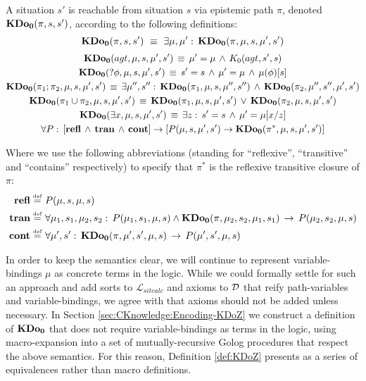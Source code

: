 \begin{defnL}
 A situation $s'$ is reachable
from situation $s$ via epistemic path $\pi$, denoted $\mathbf{KDo_{0}}(\pi,s,s')$,
according to the following definitions:\label{def:KDoZ}\[
\mathbf{KDo_{0}}(\pi,s,s')\,\,\equiv\,\,\exists\mu,\mu':\,\mathbf{KDo_{0}}(\pi,\mu,s,\mu',s')\]
 \begin{gather*}
\mathbf{KDo_{0}}(agt,\mu,s,\mu',s')\,\equiv\,\mu'=\mu\,\wedge\, K_{0}(agt,s',s)\\
\mathbf{KDo_{0}}(?\phi,\mu,s,\mu',s')\,\equiv\, s'=s\,\wedge\,\mu'=\mu\,\wedge\,\mu(\phi)[s]\\
\mathbf{KDo_{0}}(\pi_{1};\pi_{2},\mu,s,\mu',s')\,\equiv\,\exists\mu'',s'':\,\mathbf{KDo_{0}}(\pi_{1},\mu,s,\mu'',s'')\,\wedge\,\mathbf{KDo_{0}}(\pi_{2},\mu'',s'',\mu',s')\\
\mathbf{KDo_{0}}(\pi_{1}\cup\pi_{2},\mu,s,\mu',s')\,\equiv\,\mathbf{KDo_{0}}(\pi_{1},\mu,s,\mu',s')\,\vee\,\mathbf{KDo_{0}}(\pi_{2},\mu,s,\mu',s')\\
\mathbf{KDo_{0}}(\exists x,\mu,s,\mu',s')\,\equiv\,\exists z:\, s'=s\,\wedge\,\mu'=\mu[x/z]\\
\forall P:\,\left[\mathbf{refl}\,\wedge\,\mathbf{tran}\,\wedge\,\mathbf{cont}\right]\rightarrow\left[P(\mu,s,\mu',s')\rightarrow\mathbf{KDo_{0}}(\pi^{*},\mu,s,\mu',s')\right]\end{gather*}

\end{defnL}
Where we use the following abbreviations (standing for {}``reflexive'',
{}``transitive'' and {}``contains'' respectively) to specify that
$\pi^{*}$ is the reflexive transitive closure of $\pi$:\begin{align*}
\mathbf{refl}\stackrel{\mbox{\tiny def}}{=} & \,\, P(\mu,s,\mu,s)\\
\mathbf{tran\stackrel{\mbox{\tiny def}}{=}} & \,\,\forall\mu_{1},s_{1},\mu_{2},s_{2}:\, P(\mu_{1},s_{1},\mu,s)\wedge\mathbf{KDo_{0}}(\pi,\mu_{2},s_{2},\mu_{1},s_{1})\,\rightarrow\, P(\mu_{2},s_{2},\mu,s)\\
\mathbf{cont}\stackrel{\mbox{\tiny def}}{=} & \,\,\forall\mu',s':\,\mathbf{KDo_{0}}(\pi,\mu',s',\mu,s)\,\rightarrow\, P(\mu',s',\mu,s)\end{align*}


In order to keep the semantics clear, we will continue to represent
variable-bindings $\mu$ as concrete terms in the logic. While we
could formally settle for such an approach and add sorts to $\mathcal{L}_{sitcalc}$
and axioms to $\mathcal{D}$ that reify path-variables and variable-bindings,
we agree with \citet{levesque97golog} that axioms should not be added
unless necessary. In Section \ref{sec:CKnowledge:Encoding-KDoZ} we
construct a definition of $\mathbf{KDo_{0}}$ that does not require variable-bindings
as terms in the logic, using macro-expansion into a set of mutually-recursive
Golog procedures that respect the above semantics. For this reason,
Definition \ref{def:KDoZ} presents as a series of equivalences rather
than macro definitions.

